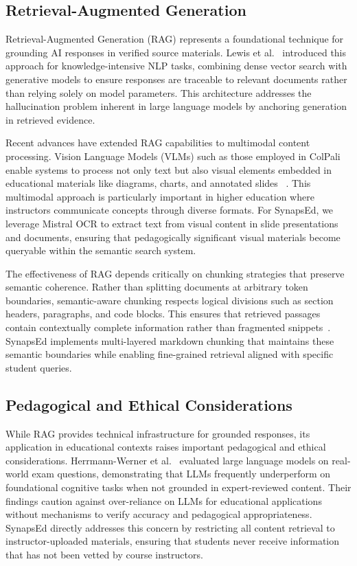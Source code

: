\documentclass{stylefiles/capstone}
\begin{document}
\subsection{Retrieval-Augmented Generation}

Retrieval-Augmented Generation (RAG) represents a foundational technique for grounding AI responses in verified source materials. Lewis et al.~\cite{lewis2021rag} introduced this approach for knowledge-intensive NLP tasks, combining dense vector search with generative models to ensure responses are traceable to relevant documents rather than relying solely on model parameters. This architecture addresses the hallucination problem inherent in large language models by anchoring generation in retrieved evidence.

Recent advances have extended RAG capabilities to multimodal content processing. Vision Language Models (VLMs) such as those employed in ColPali enable systems to process not only text but also visual elements embedded in educational materials like diagrams, charts, and annotated slides ~\cite{faysse2025colpaliefficientdocumentretrieval}. This multimodal approach is particularly important in higher education where instructors communicate concepts through diverse formats. For SynapsEd, we leverage Mistral OCR to extract text from visual content in slide presentations and documents, ensuring that pedagogically significant visual materials become queryable within the semantic search system.

The effectiveness of RAG depends critically on chunking strategies that preserve semantic coherence. Rather than splitting documents at arbitrary token boundaries, semantic-aware chunking respects logical divisions such as section headers, paragraphs, and code blocks. This ensures that retrieved passages contain contextually complete information rather than fragmented snippets~\cite{lewis2021rag}. SynapsEd implements multi-layered markdown chunking that maintains these semantic boundaries while enabling fine-grained retrieval aligned with specific student queries.

\subsection{Pedagogical and Ethical Considerations}

While RAG provides technical infrastructure for grounded responses, its application in educational contexts raises important pedagogical and ethical considerations. Herrmann-Werner et al.~\cite{Herrmann-Werner2024} evaluated large language models on real-world exam questions, demonstrating that LLMs frequently underperform on foundational cognitive tasks when not grounded in expert-reviewed content. Their findings caution against over-reliance on LLMs for educational applications without mechanisms to verify accuracy and pedagogical appropriateness. SynapsEd directly addresses this concern by restricting all content retrieval to instructor-uploaded materials, ensuring that students never receive information that has not been vetted by course instructors.
\end{document}
